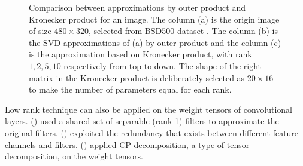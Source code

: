 \documentclass{article}
\begin{document}
\begin{figure}
\centering
{}
\caption{Comparison between approximations by outer product and Kronecker product for an image. The column (a) is the origin image of size $480\times 320$, selected from BSD500 dataset \cite{amfm_pami2011}. The column (b) is the SVD approximations of (a) by outer product and the column (c) is the approximation based on Kronecker product\cite{van1993approximation}, with rank $1, 2, 5, 10$ respectively from top to down. The shape of the right matrix in the Kronecker product is deliberately selected as $20\times 16$ to make the number of parameters equal for each rank.}
\label{fig:bears}
\end{figure}

Low rank technique can also be applied on the weight tensors of convolutional layers. \citeauthor{rigamonti2013learning}
(\citeyear{rigamonti2013learning}) used a shared set of separable (rank-1) filters to approximate the original filters. \citeauthor{DBLP:conf/bmvc/JaderbergVZ14} (\citeyear{DBLP:conf/bmvc/JaderbergVZ14}) exploited the redundancy that exists between different feature channels and filters.  \citeauthor{lebedev2014speeding} (\citeyear{lebedev2014speeding}) applied CP-decomposition, a type of tensor decomposition, on the weight tensors.
\end{document}
